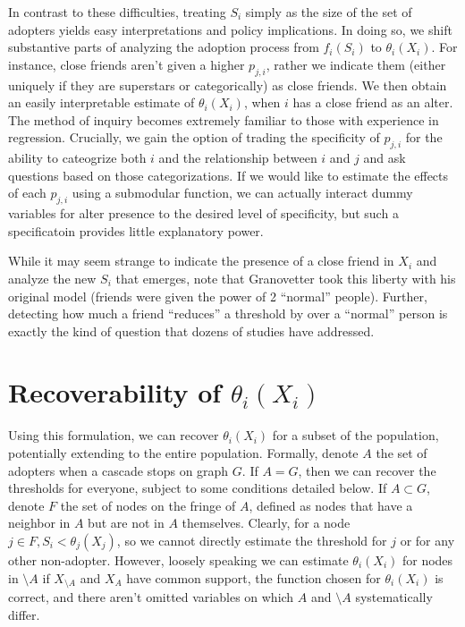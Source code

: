 \documentclass{article}
\begin{document}
In contrast to these difficulties, treating $S_i$ simply as the size of the set of adopters yields easy interpretations and policy implications. In doing so, we shift substantive parts of analyzing the adoption process from $f_i(S_i)$ to $\theta_i(X_i)$. For instance, close friends aren't given a higher $p_{j,i}$, rather we indicate them (either uniquely if they are superstars or categorically) as close friends. We then obtain an easily interpretable estimate of $\theta_i(X_i)$, when $i$ has a close friend as an alter. The method of inquiry becomes extremely familiar to those with experience in regression. Crucially, we gain the option of trading the specificity of $p_{j,i}$ for the ability to cateogrize both $i$ and the relationship between $i$ and $j$ and ask questions based on those categorizations. If we would like to estimate the effects of each $p_{j,i}$ using a submodular function, we can actually interact dummy variables for alter presence to the desired level of specificity, but such a specificatoin provides little explanatory power.

While it may seem strange to indicate the presence of a close friend in $X_i$ and analyze the new $S_i$ that emerges, note that Granovetter took this liberty with his original model (friends were given the power of 2 ``normal'' people). Further, detecting how much a friend ``reduces'' a threshold by over a ``normal'' person is exactly the kind of question that dozens of studies have addressed.

\section{Recoverability of $\theta_i(X_i)$}

Using this formulation, we can recover $\theta_i(X_i)$ for a subset of the population, potentially extending to the entire population. Formally, denote $A$ the set of adopters when a cascade stops on graph $G$. If $A = G$, then we can recover the thresholds for everyone, subject to some conditions detailed below. If $A \subset G$, denote $F$ the set of nodes on the fringe of $A$, defined as nodes that have a neighbor in $A$ but are not in $A$ themselves. Clearly, for a node $j \in F, S_i < \theta_j(X_j)$, so we cannot directly estimate the threshold for $j$ or for any other non-adopter. However, loosely speaking we can estimate $\theta_i(X_i)$ for nodes in $\setminus A$ if $X_{\setminus A}$ and $X_A$ have common support, the function chosen for $\theta_i(X_i)$ is correct, and there aren't omitted variables on which $A$ and $\setminus A$ systematically differ. 
\end{document}
